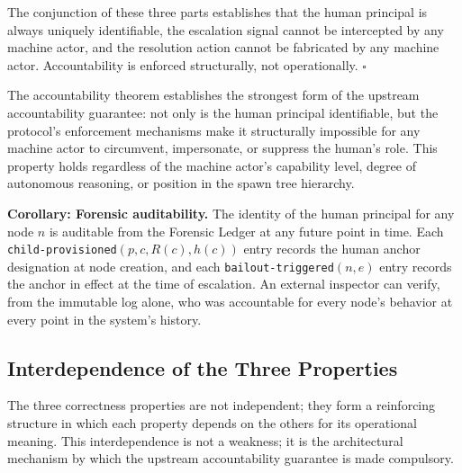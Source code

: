 The conjunction of these three parts establishes that the human principal is always uniquely identifiable, the escalation signal cannot be intercepted by any machine actor, and the resolution action cannot be fabricated by any machine actor. Accountability is enforced structurally, not operationally. $\square$

The accountability theorem establishes the strongest form of the upstream accountability guarantee: not only is the human principal identifiable, but the protocol's enforcement mechanisms make it structurally impossible for any machine actor to circumvent, impersonate, or suppress the human's role. This property holds regardless of the machine actor's capability level, degree of autonomous reasoning, or position in the spawn tree hierarchy.

\textbf{Corollary: Forensic auditability.} The identity of the human principal for any node $n$ is auditable from the Forensic Ledger at any future point in time. Each \texttt{child-provisioned}$(p, c, R(c), h(c))$ entry records the human anchor designation at node creation, and each \texttt{bailout-triggered}$(n, e)$ entry records the anchor in effect at the time of escalation. An external inspector can verify, from the immutable log alone, who was accountable for every node's behavior at every point in the system's history.

\subsection{Interdependence of the Three Properties}
\label{sec:property-interdependence}

The three correctness properties are not independent; they form a reinforcing structure in which each property depends on the others for its operational meaning. This interdependence is not a weakness; it is the architectural mechanism by which the upstream accountability guarantee is made compulsory.


